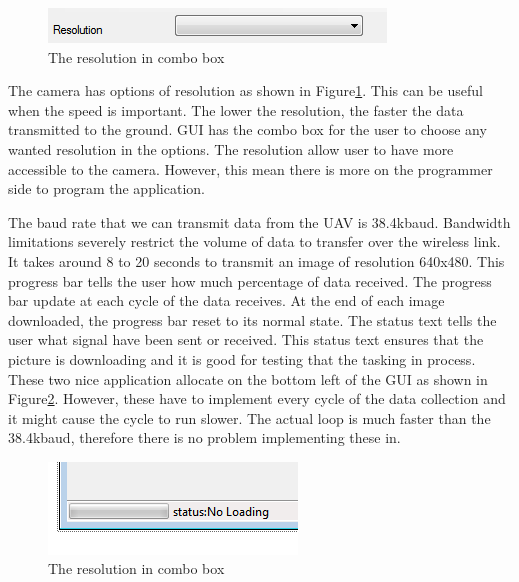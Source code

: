 \begin{figure}[H]
\begin{center}
\includegraphics[scale=0.5]{figures/resolutionOption.png} 
\end{center}
\caption{The resolution in combo box\label{resolutionOption}}
\end{figure}
The camera has options of resolution as shown in Figure\ref{resolutionOption}. This can be useful when the speed is important. The lower the resolution, the faster the data transmitted to the ground. GUI has the combo box for the user to choose any wanted resolution in the options. The resolution allow user to have more accessible to the camera. However, this mean there is more on the programmer side to program the application.


The baud rate that we can transmit data from the UAV is 38.4kbaud. Bandwidth limitations severely restrict the volume of data to transfer over the wireless link. It takes around 8 to 20 seconds to transmit an image of resolution 640x480. This progress bar tells the user how much percentage of data received. The progress bar update at each cycle of the data receives. At the end of each image downloaded, the progress bar reset to its normal state.  The status text tells the user what signal have been sent or received. This status text ensures that the picture is downloading and it is good for testing that the tasking in process. These two nice application allocate on the bottom left of the GUI as shown in Figure\ref{progressBar}. However, these have to implement every cycle of the data collection and it might cause the cycle to run slower. The actual loop is much faster than the 38.4kbaud, therefore there is no problem implementing these in.
\begin{figure}[!hbtp]
\begin{center}
\includegraphics[scale=0.5]{figures/progressBar.png} 
\end{center}
\caption{The resolution in combo box\label{progressBar}}
\end{figure}



